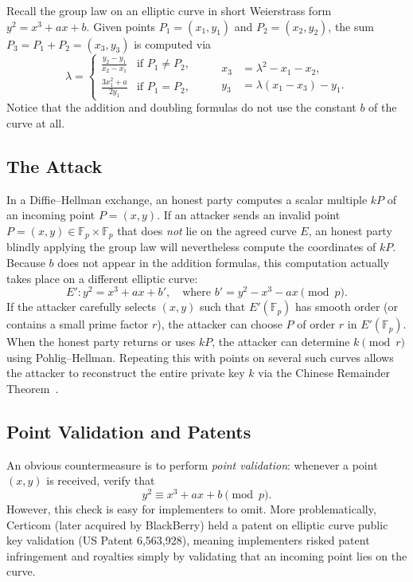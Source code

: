 Recall the group law on an elliptic curve in short Weierstrass form \(y^2 = x^3 + ax + b\).
Given points \(P_1 = (x_1, y_1)\) and \(P_2 = (x_2, y_2)\), the sum \(P_3 = P_1 + P_2 = (x_3, y_3)\) is computed via
\[
    \lambda =
    \begin{cases}
        \frac{y_2 - y_1}{x_2 - x_1} & \text{if } P_1 \neq P_2, \\[0.5em]
        \frac{3x_1^2 + a}{2y_1} & \text{if } P_1 = P_2,
    \end{cases}
    \qquad
    \begin{aligned}
        x_3 &= \lambda^2 - x_1 - x_2, \\
        y_3 &= \lambda(x_1 - x_3) - y_1.
    \end{aligned}
\]
Notice that the addition and doubling formulas do not use the constant \(b\) of the curve at all.

\subsection*{The Attack}

In a Diffie--Hellman exchange, an honest party computes a scalar multiple \(k P\) of an incoming point \(P = (x, y)\).
If an attacker sends an invalid point \(P = (x, y) \in \mathbb{F}_p \times \mathbb{F}_p\) that does \emph{not} lie on the agreed curve \(E\), an honest party blindly applying the group law will nevertheless compute the coordinates of \(k P\).
Because \(b\) does not appear in the addition formulas, this computation actually takes place on a different elliptic curve:
\[
    E': y^2 = x^3 + ax + b', \quad \text{where } b' = y^2 - x^3 - ax \pmod p.
\]
If the attacker carefully selects \((x, y)\) such that \(E'(\mathbb{F}_p)\) has smooth order (or contains a small prime factor \(r\)), the attacker can choose \(P\) of order \(r\) in \(E'(\mathbb{F}_p)\).
When the honest party returns or uses \(k P\), the attacker can determine \(k \pmod r\) using Pohlig--Hellman.
Repeating this with points on several such curves allows the attacker to reconstruct the entire private key \(k\) via the Chinese Remainder Theorem~\cite{BiehlMeyerMueller2000}.

\subsection*{Point Validation and Patents}

An obvious countermeasure is to perform \emph{point validation}: whenever a point \((x, y)\) is received, verify that
\[
    y^2 \equiv x^3 + ax + b \pmod p.
\]
However, this check is easy for implementers to omit.
More problematically, Certicom (later acquired by BlackBerry) held a patent on elliptic curve public key validation (US Patent 6,563,928), meaning implementers risked patent infringement and royalties simply by validating that an incoming point lies on the curve.


